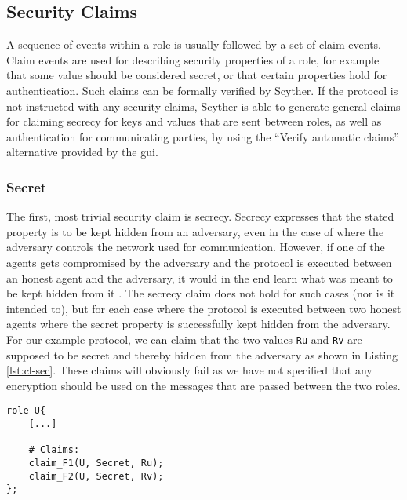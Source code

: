 \subsection{Security Claims}
\label{subsec:claims}

A sequence of events within a role is usually followed by a set of claim events. Claim events are used for describing security properties of a role, for example that some value should be considered secret, or that certain properties hold for authentication. Such claims can be formally verified by Scyther. If the protocol is not instructed with any security claims, Scyther is able to generate general claims for claiming secrecy for keys and values that are sent between roles, as well as authentication for communicating parties, by using the ``Verify automatic claims'' alternative provided by the \gls{gui}.

\subsubsection{Secret}


The first, most trivial security claim is secrecy. Secrecy expresses that the stated property is to be kept hidden from an adversary, even in the case of where the adversary controls the network used for communication. However, if one of the agents gets compromised by the adversary and the protocol is executed between an honest agent and the adversary, it would in the end learn what was meant to be kept hidden from it \cite{cremers2005operational}. The secrecy claim does not hold for such cases (nor is it intended to), but for each case where the protocol is executed between two honest agents where the secret property is successfully kept hidden from the adversary. For our example protocol, we can claim that the two values \texttt{Ru} and \texttt{Rv} are supposed to be secret and thereby hidden from the adversary as shown in Listing \ref{lst:cl-sec}. These claims will obviously fail as we have not specified that any encryption should be used on the messages that are passed between the two roles.\newline

\newpage

\begin{lstlisting}[caption={Example of how to claim secrecy for terms in Scyther.}, label={lst:cl-sec}]
role U{
	[...]
	
	# Claims:
	claim_F1(U, Secret, Ru);
	claim_F2(U, Secret, Rv);
};
\end{lstlisting}




